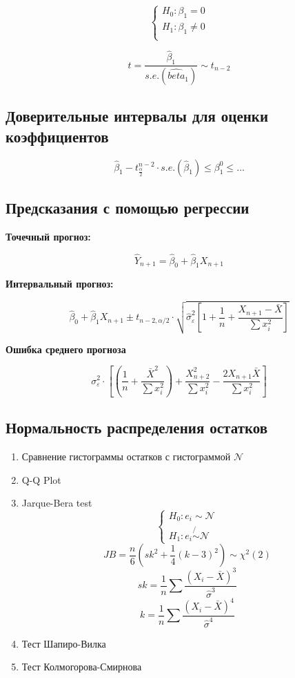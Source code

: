 \documentclass[a4paper, 12pt]{article}
\begin{document}
\[
\begin{cases}
    H_0: \beta_1 = 0 \\
    H_1: \beta_1 \neq 0 \\
\end{cases}
\]

\[t = \frac{\hat{\beta}_1}{s.e.(\hat{beta}_1)} \sim t_{n -2}\]

\begin{center}
\end{center}

\subsection{Доверительные интервалы для оценки коэффициентов}

\[\hat{\beta}_1 - t_{\frac{\alpha}{2}}^{n - 2} \cdot s.e.(\hat{\beta}_1) \leq \beta_1^0 \leq \ldots\]

\subsection{Предсказания с помощью регрессии}

\textbf{Точечный прогноз:}

\[\hat{Y}_{n + 1} = \hat{\beta}_0 + \hat{\beta}_1 X_{n + 1}\]

\textbf{Интервальный прогноз:}

\[\hat{\beta}_0 + \hat{\beta}_1 X_{n + 1} \pm t_{n - 2, \alpha / 2} \cdot \sqrt{\hat{\sigma}_{\varepsilon}^2\left[1 + \frac{1}{n} + \frac{X_{n + 1} - \bar{X}}{\sum x_i^2}\right]}\]

\textbf{Ошибка среднего прогноза}

\[\sigma_{\varepsilon}^2 \cdot \left[(\frac{1}{n} + \frac{\bar{X}^2}{\sum x_i^2}) + \frac{X_{n + 2}^2}{\sum x_i^2} - \frac{2 X_{n + 1}\bar{X}}{\sum x_i^2}\right]\]

\subsection{Нормальность распределения остатков}

\begin{enumerate}
    \item Сравнение гистограммы остатков с гистограммой $\mathcal{N}$
    \item Q-Q Plot
    \item Jarque-Bera test
    \[\begin{cases}
        H_0: e_i \sim \mathcal{N} \\
        H_1: e_i \not{\sim} \mathcal{N}
    \end{cases}\]
    \[JB = \frac{n}{6}\left(sk^2 + \frac{1}{4}(k - 3)^2\right) \sim \chi^{2}(2)\]
    \[sk = \frac{1}{n}\sum \frac{(X_i - \bar{X})^3}{\hat{\sigma}^3}\]
    \[k = \frac{1}{n}\sum\frac{(X_i - \bar{X})^4}{\hat{\sigma}^4}\]
    \item Тест Шапиро-Вилка
    \item Тест Колмогорова-Смирнова
\end{enumerate}
\end{document}
